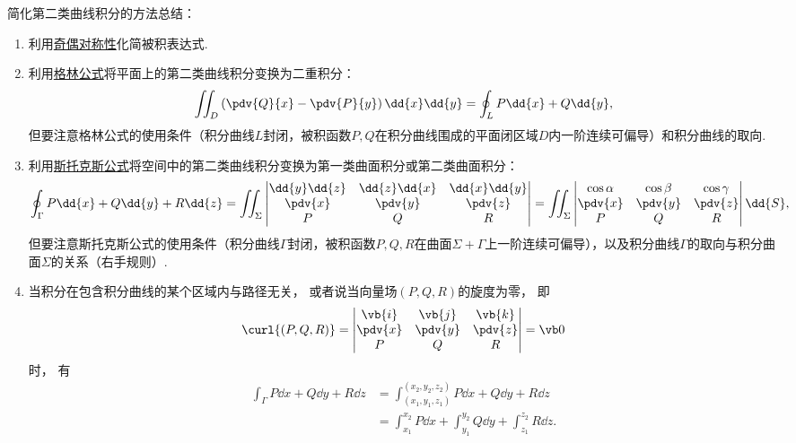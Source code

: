 简化第二类曲线积分的方法总结：\begin{enumerate}
	\item 利用\hyperref[section:线积分与面积分.利用对称性简化第二类曲线积分的计算]{奇偶对称性}化简被积表达式.

	\item 利用\hyperref[equation:线积分与面积分.格林公式]{格林公式}将平面上的第二类曲线积分变换为二重积分：\begin{equation*}
		\iint_D \left( \pdv{Q}{x} - \pdv{P}{y} \right) \dd{x}\dd{y}
		= \oint_L P\dd{x} + Q\dd{y},
	\end{equation*}
	但要注意格林公式的使用条件（积分曲线\(L\)封闭，被积函数\(P,Q\)在积分曲线围成的平面闭区域\(D\)内一阶连续可偏导）和积分曲线的取向.

	\item 利用\hyperref[equation:线积分与面积分.斯托克斯公式]{斯托克斯公式}将空间中的第二类曲线积分变换为第一类曲面积分或第二类曲面积分：\begin{equation*}
		\oint_\Gamma P\dd{x}+Q\dd{y}+R\dd{z}
		= \iint_\Sigma \begin{vmatrix}
			\dd{y}\dd{z} & \dd{z}\dd{x} & \dd{x}\dd{y} \\
			\pdv{x} & \pdv{y} & \pdv{z} \\
			P & Q & R
		\end{vmatrix}
		= \iint_\Sigma \begin{vmatrix}
			\cos\alpha & \cos\beta & \cos\gamma \\
			\pdv{x} & \pdv{y} & \pdv{z} \\
			P & Q & R
		\end{vmatrix} \dd{S},
	\end{equation*}
	但要注意斯托克斯公式的使用条件（积分曲线\(\Gamma\)封闭，被积函数\(P,Q,R\)在曲面\(\Sigma+\Gamma\)上一阶连续可偏导），以及积分曲线\(\Gamma\)的取向与积分曲面\(\Sigma\)的关系（右手规则）.

	\item 当积分在包含积分曲线的某个区域内与路径无关，
	或者说当向量场\((P,Q,R)\)的旋度为零，
	即\begin{equation*}
		\curl{(P,Q,R)}
		= \begin{vmatrix}
			\vb{i} & \vb{j} & \vb{k} \\
			\pdv{x} & \pdv{y} & \pdv{z} \\
			P & Q & R
		\end{vmatrix}
		= \vb0
	\end{equation*}时，
	有\begin{align*}
		\int_\Gamma P\dd{x}+Q\dd{y}+R\dd{z}
		&= \int_{(x_1,y_1,z_1)}^{(x_2,y_2,z_2)} P\dd{x}+Q\dd{y}+R\dd{z} \\
		&= \int_{x_1}^{x_2} P\dd{x}
		+ \int_{y_1}^{y_2} Q\dd{y}
		+ \int_{z_1}^{z_2} R\dd{z}.
	\end{align*}
\end{enumerate}

